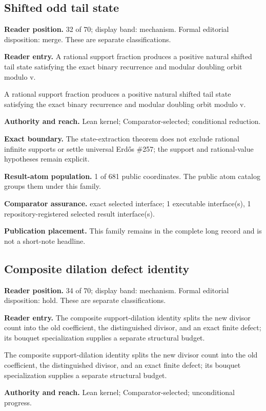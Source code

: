 \subsection{Shifted odd tail state}
\textbf{Reader position.} 32 of 70; display band: mechanism.  Formal editorial disposition: merge.  These are separate classifications.

\textbf{Reader entry.} A rational support fraction produces a positive natural shifted tail state satisfying the exact binary recurrence and modular doubling orbit modulo v.

A rational support fraction produces a positive natural shifted tail state satisfying the exact binary recurrence and modular doubling orbit modulo v.

\textbf{Authority and reach.} Lean kernel; Comparator-selected; conditional reduction.

\textbf{Exact boundary.} The state-extraction theorem does not exclude rational infinite supports or settle universal Erdős \#257; the support and rational-value hypotheses remain explicit.

\textbf{Result-atom population.} 1 of 681 public coordinates. The public atom catalog groups them under this family.

\textbf{Comparator assurance.} exact selected interface; 1 executable interface(s), 1 repository-registered selected result interface(s).

\textbf{Publication placement.} This family remains in the complete long record and is not a short-note headline.

\subsection{Composite dilation defect identity}
\textbf{Reader position.} 34 of 70; display band: mechanism.  Formal editorial disposition: hold.  These are separate classifications.

\textbf{Reader entry.} The composite support-dilation identity splits the new divisor count into the old coefficient, the distinguished divisor, and an exact finite defect; its bouquet specialization supplies a separate structural budget.

The composite support-dilation identity splits the new divisor count into the old coefficient, the distinguished divisor, and an exact finite defect; its bouquet specialization supplies a separate structural budget.

\textbf{Authority and reach.} Lean kernel; Comparator-selected; unconditional progress.

